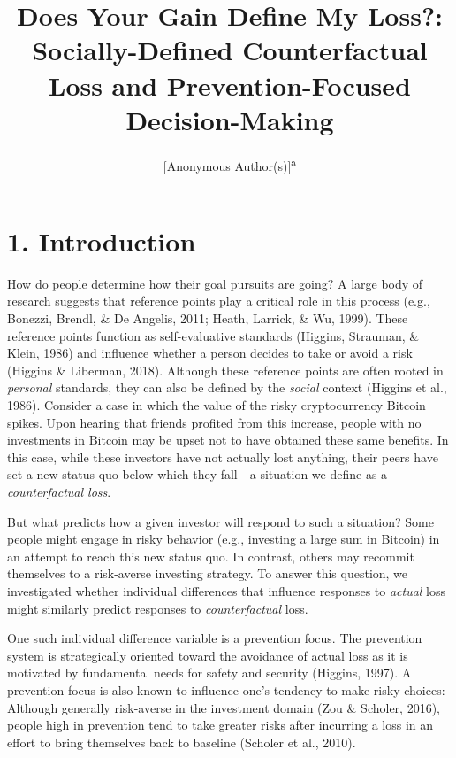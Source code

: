 \documentclass[man,floatsintext]{apa6}
\title{Does Your Gain Define My Loss?: Socially-Defined Counterfactual Loss and Prevention-Focused Decision-Making}
\author{{[}Anonymous Author(s){]}\textsuperscript{a}}
\date{}
\affiliation{
\vspace{0.5cm}
\textsuperscript{a} [Anonymized Institution(s)]}
\begin{document}
\maketitle

\hypertarget{introduction}{%
\section{1. Introduction}\label{introduction}}

How do people determine how their goal pursuits are going? A large body of research suggests that reference points play a critical role in this process (e.g., Bonezzi, Brendl, \& De Angelis, 2011; Heath, Larrick, \& Wu, 1999). These reference points function as self-evaluative standards (Higgins, Strauman, \& Klein, 1986) and influence whether a person decides to take or avoid a risk (Higgins \& Liberman, 2018). Although these reference points are often rooted in \emph{personal} standards, they can also be defined by the \emph{social} context (Higgins et al., 1986). Consider a case in which the value of the risky cryptocurrency Bitcoin spikes. Upon hearing that friends profited from this increase, people with no investments in Bitcoin may be upset not to have obtained these same benefits. In this case, while these investors have not actually lost anything, their peers have set a new status quo below which they fall---a situation we define as a \emph{counterfactual loss}.

But what predicts how a given investor will respond to such a situation? Some people might engage in risky behavior (e.g., investing a large sum in Bitcoin) in an attempt to reach this new status quo. In contrast, others may recommit themselves to a risk-averse investing strategy. To answer this question, we investigated whether individual differences that influence responses to \emph{actual} loss might similarly predict responses to \emph{counterfactual} loss.

One such individual difference variable is a prevention focus. The prevention system is strategically oriented toward the avoidance of actual loss as it is motivated by fundamental needs for safety and security (Higgins, 1997). A prevention focus is also known to influence one's tendency to make risky choices: Although generally risk-averse in the investment domain (Zou \& Scholer, 2016), people high in prevention tend to take greater risks after incurring a loss in an effort to bring themselves back to baseline (Scholer et al., 2010).
\end{document}
